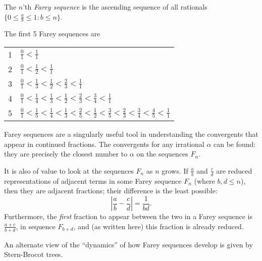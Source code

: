 \documentclass[12pt]{article}
\begin{document}
The $n$'th \emph{Farey sequence} is the ascending sequence of all rationals
$\{0 \le \frac{a}{b} \le 1 : b \le n\}$.

The first 5 Farey sequences are

\begin{center}
\begin{tabular}[htp]{|cl|}
\hline
1 & $ \frac{0}{1} < \frac{1}{1} $ \\
2 & $ \frac{0}{1} < \frac{1}{2} < \frac{1}{1} $ \\
3 & $ \frac{0}{1} < \frac{1}{3} < \frac{1}{2} < \frac{2}{3} < \frac{1}{1} $ \\
4 & $ \frac{0}{1} < \frac{1}{4} < \frac{1}{3} < \frac{1}{2} < \frac{2}{3} < \frac{3}{4} < \frac{1}{1} $ \\
5 & $ \frac{0}{1} < \frac{1}{5} < \frac{1}{4} < \frac{1}{3} < \frac{2}{5} < \frac{1}{2} < \frac{3}{5} < \frac{2}{3} < \frac{3}{4} < \frac{4}{5} < \frac{1}{1} $ \\
\hline
\end{tabular}
\end{center}

Farey sequences are a singularly useful tool in understanding the convergents that appear in continued fractions.  The convergents for any irrational $\alpha$ can be  found: they are precisely the closest number to $\alpha$ on the sequences $F_n$.

It is also of value to look at the sequences $F_n$ as $n$ grows.  If $\frac{a}{b}$ and $\frac{c}{d}$ are reduced representations of adjacent terms in some Farey sequence $F_n$ (where $b,d\le n$), then they are adjacent fractions; their difference is the least possible:
$$
\left|\frac{a}{b}-\frac{c}{d}\right| = \frac{1}{bd}.
$$
Furthermore, the \emph{first} fraction to appear between the two in a Farey sequence is $\frac{a+c}{b+d}$, in sequence $F_{b+d}$, and (as written here) this fraction is already reduced.

An alternate view of the ``dynamics'' of how Farey sequences develop is given by Stern-Brocot trees.
\end{document}
